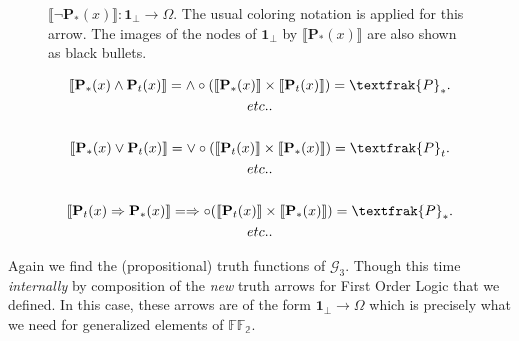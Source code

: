 \begin{figure}[h]
	\centering
	\caption{$\llbracket \neg\textbf{P}_*(x)\rrbracket : \textbf{1}_\bot \rightarrow \Omega$.  The usual coloring notation is applied for this arrow. The images of the nodes of $\textbf{1}_\bot$ by $\llbracket \textbf{P}_*(x)\rrbracket$ are also shown as black bullets.}
\end{figure}	

\begin{gather*}
	\llbracket \textbf{P}_* (x) \land \textbf{P}_t (x) \rrbracket = \land \circ (\llbracket \textbf{P}_* (x) \rrbracket \times \llbracket \textbf{P}_t (x) \rrbracket) = \textfrak{P}_*. \\
	etc.. \\ \\
	\llbracket \textbf{P}_* (x) \lor \textbf{P}_t (x) \rrbracket = \lor \circ (\llbracket \textbf{P}_t (x) \rrbracket \times \llbracket \textbf{P}_* (x) \rrbracket) = \textfrak{P}_t. \\
	etc.. \\ \\
	\llbracket \textbf{P}_t (x) \Rightarrow \textbf{P}_* (x) \rrbracket = \Rightarrow \circ (\llbracket \textbf{P}_t (x) \rrbracket \times \llbracket \textbf{P}_* (x) \rrbracket) = \textfrak{P}_*. \\
	etc..
\end{gather*}
\newpage
\begin{remark}
	Again we find the (propositional) truth functions of $\mathcal{G}_3$.
	Though this time \emph{internally} by composition of the \emph{new} truth arrows for First Order Logic that we defined. In this case, these arrows are of the form $\textbf{1}_\bot \rightarrow \Omega$ which is precisely what we need for generalized elements of $\mathbb{FF_2}$. 
\end{remark}
 
